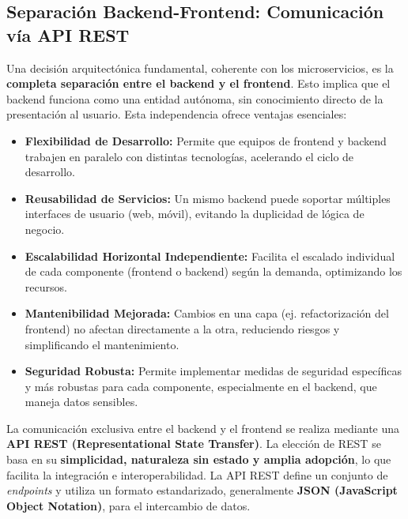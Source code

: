 \subsection{Separación Backend-Frontend: Comunicación vía API REST}

Una decisión arquitectónica fundamental, coherente con los microservicios, es la \textbf{completa separación entre el backend y el frontend}. Esto implica que el backend funciona como una entidad autónoma, sin conocimiento directo de la presentación al usuario. Esta independencia ofrece ventajas esenciales:

\begin{itemize}
    \item \textbf{Flexibilidad de Desarrollo:} Permite que equipos de frontend y backend trabajen en paralelo con distintas tecnologías, acelerando el ciclo de desarrollo.
    \item \textbf{Reusabilidad de Servicios:} Un mismo backend puede soportar múltiples interfaces de usuario (web, móvil), evitando la duplicidad de lógica de negocio.
    \item \textbf{Escalabilidad Horizontal Independiente:} Facilita el escalado individual de cada componente (frontend o backend) según la demanda, optimizando los recursos.
    \item \textbf{Mantenibilidad Mejorada:} Cambios en una capa (ej. refactorización del frontend) no afectan directamente a la otra, reduciendo riesgos y simplificando el mantenimiento.
    \item \textbf{Seguridad Robusta:} Permite implementar medidas de seguridad específicas y más robustas para cada componente, especialmente en el backend, que maneja datos sensibles.
\end{itemize}

La comunicación exclusiva entre el backend y el frontend se realiza mediante una \textbf{API REST (Representational State Transfer)}. La elección de REST se basa en su \textbf{simplicidad, naturaleza sin estado y amplia adopción}, lo que facilita la integración e interoperabilidad. La API REST define un conjunto de \textit{endpoints} y utiliza un formato estandarizado, generalmente \textbf{JSON (JavaScript Object Notation)}, para el intercambio de datos.

